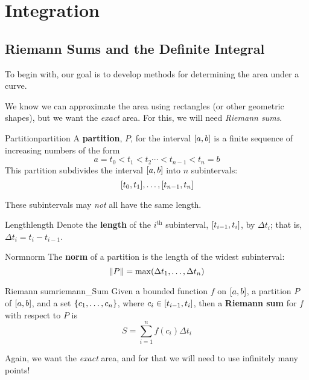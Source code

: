 \chapter{Integration}
\setcounter{section}{1}
\section{Riemann Sums and the Definite Integral}
To begin with, our goal is to develop methods for determining the area under a curve.

We know we can approximate the area using rectangles (or other geometric shapes), but
we want the \emph{exact} area. For this, we will need \emph{Riemann sums}.

\begin{Definition}{Partition}{partition}
    A \textbf{partition}, $P$, for the interval $ \interval{a}{b} $ is a finite
    sequence of increasing numbers of the form
    \[ a=t_0<t_1<t_2\cdots<t_{n-1}<t_n=b \]
    This partition subdivides the interval $ \interval{a}{b} $ into $ n $ subintervals:
    \[ \interval{t_0}{t_1},\ldots,\interval{t_{n-1}}{t_n} \]
\end{Definition}

\begin{Remark}{}{}
    These subintervals may \emph{not} all have the same length.
\end{Remark}

\begin{Definition}{Length}{length}
    Denote the \textbf{length} of the $ i^{\text{th}} $ subinterval,
    $ \interval{t_{i-1}}{t_i} $, by $ \Delta t_i $; that is, $ \Delta t_i=t_i-t_{i-1} $.
\end{Definition}

\begin{Definition}{Norm}{norm}
    The \textbf{norm} of a partition is the length of the widest subinterval:
    \[ \lVert P\rVert=\max(\Delta t_1,\dots,\Delta t_{n}) \]
\end{Definition}

\begin{Definition}{Riemann sum}{riemann_Sum}
    Given a bounded function $ f $ on $ \interval{a}{b} $,
    a partition $ P $ of $ \interval{a}{b} $, and a set
    $ \{c_1,\dots,c_n\} $, where $ c_i\in\interval{t_{i-1}}{t_i} $, then a
    \textbf{Riemann sum} for $ f $ with respect to $ P $ is
    \[ S=\sum\limits_{i=1}^{n} f(c_i)\Delta t_i \]
\end{Definition}

Again, we want the \emph{exact} area, and for that we will need to use infinitely
many points!

